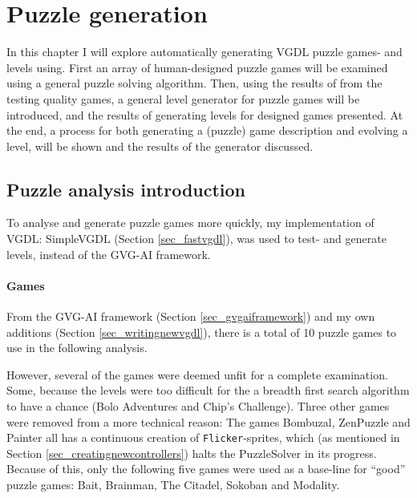 \documentclass[a4paper,titlepage,final]{report}
\begin{document}
\chapter{Puzzle generation}
\label{ch_task3}
In this chapter I will explore automatically generating VGDL puzzle games- and levels using.
First an array of human-designed puzzle games will be examined using a general puzzle solving algorithm.
Then, using the results of from the testing quality games, a general level generator for puzzle games will be introduced, and the results of generating levels for designed games presented.
At the end, a process for both generating a (puzzle) game description and evolving a level, will be shown and the results of the generator discussed.

\section{Puzzle analysis introduction}
\label{sec_task3intro}
To analyse and generate puzzle games more quickly, my implementation of VGDL: SimpleVGDL (Section \ref{sec_fastvgdl}), was used to test- and generate levels, instead of the GVG-AI framework.



\subsubsection*{Games} 
From the GVG-AI framework (Section \ref{sec_gvgaiframework}) and my own additions (Section \ref{sec_writingnewvgdl}), there is a total of 10 puzzle games to use in the following analysis.

However, several of the games were deemed unfit for a complete examination.
Some, because the levels were too difficult for the a breadth first search algorithm to have a chance (Bolo Adventures and Chip's Challenge).
Three other games were removed from a more technical reason: 
The games Bombuzal, ZenPuzzle and Painter all has a continuous creation of \texttt{Flicker}-sprites, which (as mentioned in Section \ref{sec_creatingnewcontrollers})  halts the PuzzleSolver in its progress.
Because of this, only the following five games were used as a base-line for ``good'' puzzle games: Bait, Brainman, The Citadel, Sokoban and Modality.
\end{document}
